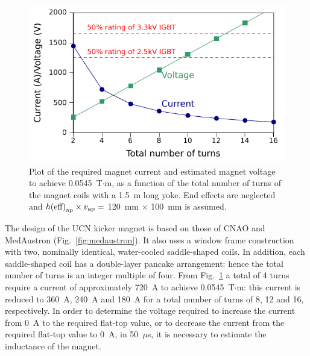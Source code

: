 \documentclass[aps,prab,twocolumn,superscriptaddress]{revtex4-1}
\begin{document}
\begin{figure}[b]
	\includegraphics[width=\linewidth]{Voltage-Current.pdf}
	\caption{Plot of the required magnet current and estimated magnet voltage to achieve 0.0545~T$\cdot$m, as a function of the total number of turns of the magnet coils with a 1.5~m long yoke. End effects are neglected and $h{\rm(eff)}_{\rm{ap}} \times v_{\rm{ap}} = $ 120~mm $\times$ 100~mm is assumed.}
	\label{fig:VoltageCurrent}
\end{figure}

The design of the UCN kicker magnet is based on those of CNAO and MedAustron (Fig.~\ref{fig:medaustron}). 
It also uses a window frame construction with two, nominally identical, water-cooled saddle-shaped coils. 
In addition, each saddle-shaped coil has a double-layer pancake arrangement: hence the total number of turns is an integer multiple of four. From Fig.~\ref{fig:VoltageCurrent} a total of 4 turns require a current of approximately 720~A to achieve 0.0545~T$\cdot$m: this current is reduced to 360~A, 240~A and 180~A for a total number of turns of 8, 12 and 16, respectively. In order to determine the voltage required to increase the current from 0~A to the required flat-top value, or to decrease the current from the required flat-top value to 0~A, in 50~$\mu$s, it is necessary to estimate the inductance of the magnet. 
\end{document}
